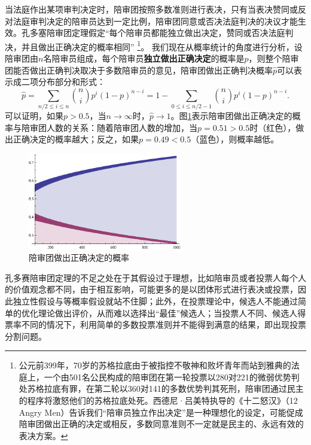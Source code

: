 当法庭作出某项审判决定时，陪审团按照多数准则进行表决，只有当表决赞同或反对法庭审判决定的陪审员达到一定比例，陪审团同意或否决法庭判决的决议才能生效。孔多塞陪审团定理假定“每个陪审员都能独立做出决定，赞同或否决法庭判决，并且做出正确决定的概率相同”
\footnote{公元前399年，70岁的苏格拉底由于被指控不敬神和败坏青年而站到雅典的法庭上，一个由501名公民构成的陪审团在第一轮投票以280对221的微弱优势判处苏格拉底有罪，在第二轮以360对141的多数优势判其死刑，陪审团通过民主的程序将激怒他们的苏格拉底处死。西德尼·吕美特执导的《十二怒汉》（12 Angry Men）告诉我们“陪审员独立作出决定”是一种理想化的设定，可能促成陪审团做出正确的决定或相反，多数同意准则不一定就是民主的、永远有效的表决方案。}。
我们现在从概率统计的角度进行分析，设陪审团由$n$名陪审员组成，每个陪审员\textbf{独立做出正确决定}的概率是$p$，则整个陪审团能否做出正确判决取决于多数陪审员的意见，陪审团做出正确判决概率$\hat p$可以表示成二项分布部分和形式：
\begin{equation}
    \hat p = \sum\limits_{n/2\le i \le n} \binom{n}{i} p^i(1-p)^{n-i} = 1 - \sum\limits_{0\le i\le n/2-1}\binom{n}{i} p^i(1-p)^{n-i}.
\end{equation}
可以证明，如果$p>0.5$，当$n\rightarrow \infty$时，$\hat p\rightarrow 1$。图\ref{fig:concorcetjury}表示陪审团做出正确决定的概率与陪审团人数的关系：随着陪审团人数的增加，当$p=0.51>0.5$时（红色），做出正确决定的概率越大；反之，如果$p=0.49<0.5$（蓝色），则概率越低。
\begin{figure}[htbp]
  \centering
  \includegraphics[width=0.6\textwidth]{figures/concorcetjury.eps}
  \caption{陪审团做出正确决定的概率}\label{fig:concorcetjury}
\end{figure}

孔多赛陪审团定理的不足之处在于其假设过于理想，比如陪审员或者投票人每个人的价值观念都不同，由于相互影响，可能更多的是以团体形式进行表决或投票，因此独立性假设与等概率假设就站不住脚；此外，在投票理论中，候选人不能通过简单的优化理论做出评价，从而难以选择出“最佳”候选人；当投票人不同、候选人得票率不同的情况下，利用简单的多数投票准则并不能得到满意的结果，即出现投票分割问题。

